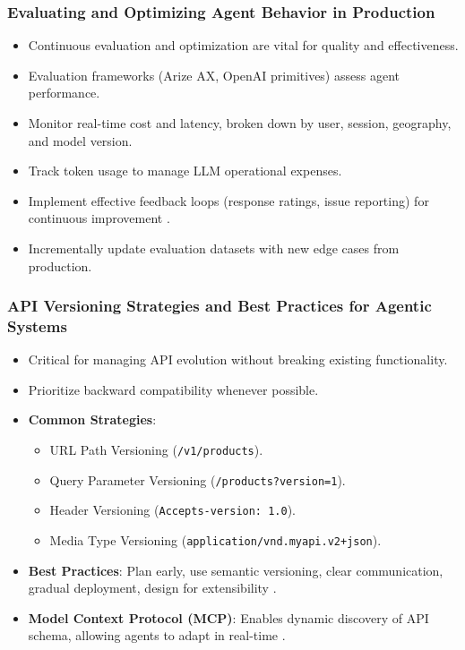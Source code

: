 \documentclass{beamer}       %
\begin{document}
\begin{frame}
    \frametitle{Evaluating and Optimizing Agent Behavior in Production}
    \begin{itemize}
        \item Continuous evaluation and optimization are vital for quality and effectiveness.
        \item Evaluation frameworks (Arize AX, OpenAI primitives) assess agent performance.
        \item Monitor real-time cost and latency, broken down by user, session, geography, and model version.
        \item Track token usage to manage LLM operational expenses.
        \item Implement effective feedback loops (response ratings, issue reporting) for continuous improvement .
        \item Incrementally update evaluation datasets with new edge cases from production.
    \end{itemize}
\end{frame}

\begin{frame}
    \frametitle{API Versioning Strategies and Best Practices for Agentic Systems}
    \begin{itemize}
        \item Critical for managing API evolution without breaking existing functionality.
        \item Prioritize backward compatibility whenever possible.
        \item \textbf{Common Strategies}:
        \begin{itemize}
            \item URL Path Versioning (\texttt{/v1/products}).
            \item Query Parameter Versioning (\texttt{/products?version=1}).
            \item Header Versioning (\texttt{Accepts-version: 1.0}).
            \item Media Type Versioning (\texttt{application/vnd.myapi.v2+json}).
        \end{itemize}
        \item \textbf{Best Practices}: Plan early, use semantic versioning, clear communication, gradual deployment, design for extensibility .
        \item \textbf{Model Context Protocol (MCP)}: Enables dynamic discovery of API schema, allowing agents to adapt in real-time .
    \end{itemize}
\end{frame}
\end{document}
